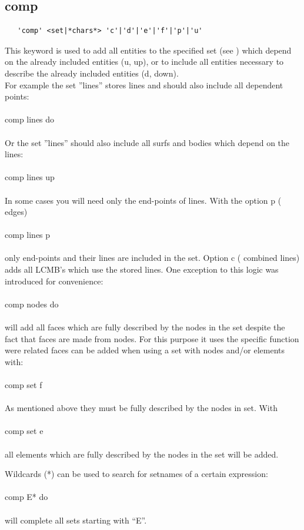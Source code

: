 \documentclass{article}
\begin{document}
\subsection{\label{comp}comp}
\begin{verbatim}
   'comp' <set|*chars*> 'c'|'d'|'e'|'f'|'p'|'u'
\end{verbatim}
This keyword is used to add all entities to the specified set (see
) which depend on the already included entities (u, up),
or to include all entities necessary to describe the already included entities
(d, down).\\For example the set ''lines'' stores lines and should also include
all dependent points:\\\\comp lines do\\\\Or the set ''lines'' should also
include all surfs and bodies which depend on the lines:\\\\comp lines up\\\\In
some cases you will need only the end-points of lines. With the option p (
edges)\\\\comp lines p\\\\only end-points and their lines are included in the set. Option c (
combined lines) adds all LCMB's which use the stored lines. One exception to this logic was introduced for convenience:\\\\comp nodes do\\\\will add all faces which are fully described by the nodes in the set despite the fact that faces are made from nodes. For this purpose it uses the specific function were related faces can be added when using a set with nodes and/or elements with:\\\\comp set f\\\\As mentioned above they must be fully described by the nodes in set. With\\\\comp set e\\\\all elements which are fully described by the nodes in the set will be added.

Wildcards (*) can be used to search for setnames of a certain expression:\\\\comp E* do\\\\will complete all sets starting with ``E''.
\end{document}
